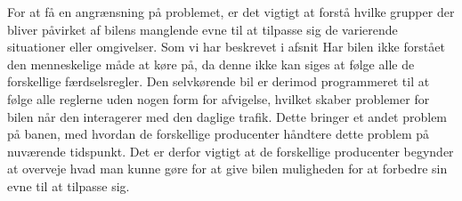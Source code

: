 For at få en angrænsning på problemet, er det vigtigt at forstå hvilke grupper der bliver påvirket af bilens manglende evne til at tilpasse sig de varierende situationer eller omgivelser. Som vi har beskrevet i afsnit \label {interaktion} 
Har bilen ikke forstået den menneskelige måde at køre på, da denne ikke kan siges at følge alle de forskellige færdselsregler. Den selvkørende bil er derimod programmeret til at følge alle reglerne uden nogen form for afvigelse, hvilket skaber problemer for bilen når den interagerer med den daglige trafik. Dette bringer et andet problem på banen, med hvordan de forskellige producenter håndtere dette problem på nuværende tidspunkt. Det er derfor vigtigt at de forskellige producenter begynder at overveje hvad man kunne gøre for at give bilen muligheden for at forbedre sin evne til at tilpasse sig. 